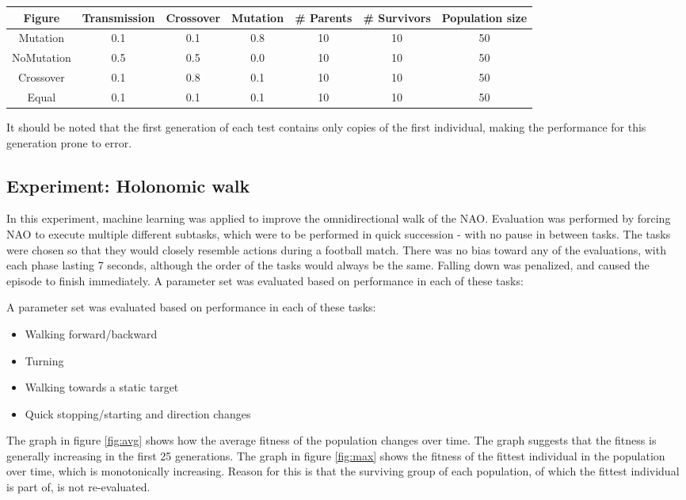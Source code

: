 \documentclass{article}
\begin{document}
\vspace{4mm}
\begin{tabular}{c | c          c           c           c         c             c  }
 Figure      &  Transmission & Crossover & Mutation & \# Parents & \# Survivors & Population size \\
 \hline
 Mutation    &  0.1              & 0.1           & 0.8          &  10  & 10  & 50  \\ 
 NoMutation  &  0.5              & 0.5           & 0.0          &  10  & 10  & 50  \\
 Crossover   &  0.1              & 0.8           & 0.1          &  10  & 10  & 50  \\
 Equal       &  0.1              & 0.1           & 0.1          &  10  & 10  & 50  \\
\end{tabular}
\vspace{4mm}

It should be noted that the first generation of each test contains only copies of the first individual, making 
the performance for this generation prone to error. 


\subsection{Experiment: Holonomic walk}
In this experiment, machine learning was applied to improve the omnidirectional walk of the NAO. Evaluation was performed by forcing NAO to execute multiple different subtasks, which were to be performed in quick succession - with no pause in between tasks. The tasks were chosen so that they would closely resemble actions during a football match. There was no bias toward any of the evaluations, with each phase lasting 7 seconds, although the order of the tasks would always be the same. Falling down was penalized, and caused the episode to finish immediately. A parameter set was evaluated based on performance in each of these tasks:

A parameter set was evaluated based on performance in each of these tasks:
\begin{itemize}
\item Walking forward/backward
\item Turning
\item Walking towards a static target
\item Quick stopping/starting and direction changes
\end{itemize}

The graph in figure \ref{fig:avg} shows how the average fitness of the
population changes over time. The graph suggests that the fitness is generally
increasing in the first 25 generations. The graph in figure \ref{fig:max} shows the fitness of the fittest individual in the population over time, which is monotonically increasing. Reason for this is that the surviving group of each population, of which the fittest individual is part of, is not re-evaluated. 
\end{document}
